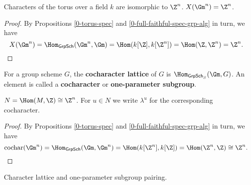 \begin{proposition}
  \label{0-char-torus}

  Characters of the torus over a field $k$ are isomorphic to $\Z^n$. $X(\Gm^n) = \Z^n$.
\end{proposition}
\begin{proof}

  By Propositions \ref{0-torus-spec} and \ref{0-full-faithful-spec-grp-alg} in turn, we have
  \[
    X(\Gm^n) = \Hom_{\mathsf{GrpSch}}(\Gm^n, \Gm) = \Hom(k[\Z], k[\Z^n]) = \Hom(\Z, \Z^n) = \Z^n.
  \]
\end{proof}


\begin{definition}
  \label{0-cochar}
  \leanok

  For a group scheme $G$, the {\bf cocharacter lattice} of $G$ is $\Hom_{\mathsf{GrpSch}_S}(\Gm, G)$.
  An element is called a {\bf cocharacter} or {\bf one-parameter subgroup}.
\end{definition}


\begin{proposition}
  \label{0-cochar-torus}

  $N = \Hom(M, \Z) \cong \Z^n$. For $u \in N$ we write $\lambda^u$ for the corresponding cocharacter.
\end{proposition}
\begin{proof}

  By Propositions \ref{0-torus-spec} and \ref{0-full-faithful-spec-grp-alg} in turn, we have
  \[
    \mathrm{cochar}(\Gm^n) = \Hom_{\mathsf{GrpSch}}(\Gm, \Gm^n) = \Hom(k[\Z^n], k[\Z]) = \Hom(\Z^n, \Z) \cong \Z^n.
  \]
\end{proof}


\begin{definition}
  \label{0-char-cochar-pairing}
  \leanok

  Character lattice and one-parameter subgroup pairing.
\end{definition}
